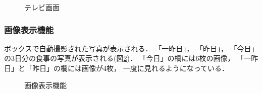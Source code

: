 \documentclass[../report]{subfiles}
\begin{document}
\begin{figure}[htbp]
    \begin{center}
        \caption{テレビ画面}
        \label{fig:5_tv-all}
    \end{center}
\end{figure}

\subsubsection{画像表示機能}
ボックスで自動撮影された写真が表示される．
「一昨日」， 「昨日」， 「今日」の3日分の食事の写真が表示される(図\ref{fig:5_tv-days})．
「今日」の欄には6枚の画像， 「一昨日」と「昨日」の欄には画像が4枚， 一度に見れるようになっている．

\begin{figure}[htbp]
    \begin{center}
        \caption{画像表示機能}
        \label{fig:5_tv-days}
    \end{center}
\end{figure}
\end{document}
